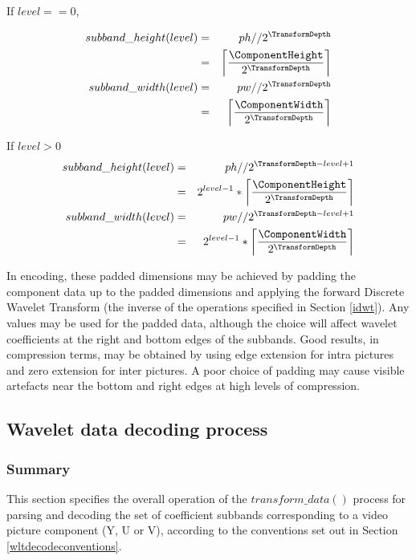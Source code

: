 If $level==0$,

\begin{eqnarray*}
subband\_height(level) & = & ph//2^{\TransformDepth} \\
& = & \left\lceil\frac{\ComponentHeight}{2^{\TransformDepth}}\right\rceil \\
subband\_width(level) & = & pw//2^{\TransformDepth} \\
& = & \left\lceil\frac{\ComponentWidth}{2^{\TransformDepth}}\right\rceil
\end{eqnarray*}

If $level>0$
\begin{eqnarray*}
subband\_height(level) & = & ph//2^{\TransformDepth-level+1} \\
& = & 2^{level-1}*\left\lceil\frac{\ComponentHeight}{2^{\TransformDepth}}\right\rceil \\
subband\_width(level) & = & pw//2^{\TransformDepth-level+1} \\
& = & 2^{level-1}*\left\lceil \frac{\ComponentWidth}{2^{\TransformDepth}}\right\rceil
\end{eqnarray*}

\begin{informative}
In encoding, these padded dimensions may be achieved by padding the 
component data up to the padded dimensions and applying the forward
Discrete Wavelet Transform (the inverse of the operations specified in
Section \ref{idwt}). Any values may be used for the padded data, although
the choice will affect wavelet coefficients at the right and bottom 
edges of the subbands. Good results, in compression terms, may be obtained
 by using edge extension for intra pictures and zero extension for inter 
pictures. A poor choice of padding may cause visible artefacts near the
bottom and right edges at high levels of compression.
\end{informative}


\subsection{Wavelet data decoding process}

\subsubsection{Summary}

\label{transformdata}

This section specifies the overall operation of the $transform\_data()$ process
for parsing and decoding the set of coefficient subbands corresponding
to a video picture component (Y, U or V), according to the conventions set out
in Section \ref{wltdecodeconventions}.

